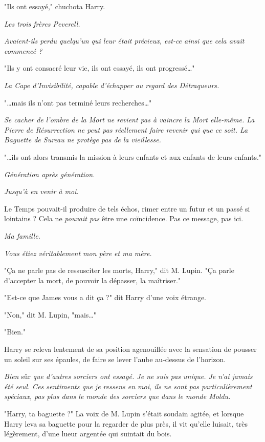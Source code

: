 "Ils ont essayé," chuchota Harry.

\emph{Les trois frères Peverell.} 

\emph{Avaient-ils perdu quelqu'un qui leur était précieux, est-ce ainsi que cela avait commencé ?} 

"Ils y ont consacré leur vie, ils ont essayé, ils ont progressé…"

\emph{La Cape d'Invisibilité, capable d'échapper au regard des Détraqueurs.} 

"…mais ils n'ont pas terminé leurs recherches…"

\emph{Se cacher de l'ombre de la Mort ne revient pas à vaincre la Mort elle-même. La Pierre de Résurrection ne peut pas réellement faire revenir qui que ce soit. La Baguette de Sureau ne protège pas de la vieillesse.} 

"…ils ont alors transmis la mission à leurs enfants et aux enfants de leurs enfants."

\emph{Génération après génération.} 

\emph{Jusqu'à en venir à moi.} 

Le Temps pouvait-il produire de tels échos, rimer entre un futur et un passé si lointains ? Cela ne \emph{pouvait pas}  être une coïncidence. Pas ce message, pas ici.

\emph{Ma famille.} 

\emph{Vous étiez véritablement mon père et ma mère.} 

"Ça ne parle pas de ressusciter les morts, Harry," dit M. Lupin. "Ça parle d'accepter la mort, de pouvoir la dépasser, la maîtriser."

"Est-ce que James vous a dit ça ?" dit Harry d'une voix étrange.

"Non," dit M. Lupin, "mais…"

"Bien."

Harry se releva lentement de sa position agenouillée avec la sensation de pousser un soleil sur ses épaules, de faire se lever l'aube au-dessus de l'horizon.

\emph{Bien}  sûr \emph{que d'autres sorciers ont essayé. Je ne suis pas unique. Je n'ai jamais été seul. Ces sentiments que je ressens en moi, ils ne sont pas particulièrement spéciaux, pas plus dans le monde des sorciers que dans le monde Moldu.} 

"Harry, ta baguette ?" La voix de M. Lupin s'était soudain agitée, et lorsque Harry leva sa baguette pour la regarder de plus près, il vit qu'elle luisait, très légèrement, d'une lueur argentée qui suintait du bois.

